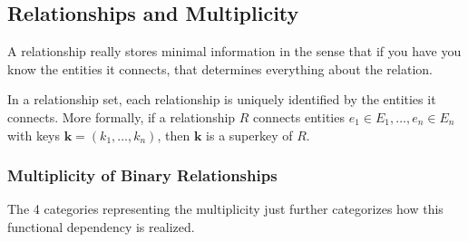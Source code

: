 \subsection{Relationships and Multiplicity} 

    A relationship really stores minimal information in the sense that if you have you know the entities it connects, that determines everything about the relation. 

    \begin{theorem}
      In a relationship set, each relationship is uniquely identified by the entities it connects. More formally, if a relationship $R$ connects entities $e_1 \in E_1, \ldots, e_n \in E_n$ with keys $\mathbf{k} = (k_1, \ldots, k_n)$, then $\mathbf{k}$ is a superkey of $R$. 
    \end{theorem}

  \subsubsection{Multiplicity of Binary Relationships}

    The 4 categories representing the multiplicity just further categorizes how this functional dependency is realized. 

